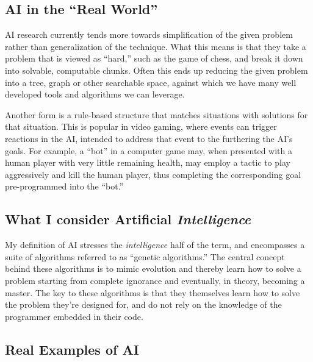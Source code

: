 \documentclass[12pt]{article} %
\begin{document}

\subsection{AI in the ``Real World''}

AI research currently tends more towards simplification of the given problem rather than generalization of the technique. What this means is that they take a problem that is viewed as ``hard,'' such as the game of chess, and break it down into solvable, computable chunks. Often this ends up reducing the given problem into a tree, graph or other searchable space, against which we have many well developed tools and algorithms we can leverage.

Another form is a rule-based structure that matches situations with solutions for that situation. This is popular in video gaming, where events can trigger reactions in the AI, intended to address that event to the furthering the AI's goals. For example, a ``bot'' in a computer game may, when presented with a human player with very little remaining health, may employ a tactic to play aggressively and kill the human player, thus completing the corresponding goal pre-programmed into the ``bot.''


\subsection{What I consider Artificial \textit{Intelligence}}

My definition of AI stresses the \textit{intelligence} half of the term, and encompasses a suite of algorithms referred to as ``genetic algorithms.'' The central concept behind these algorithms is to mimic evolution and thereby learn how to solve a problem starting from complete ignorance and eventually, in theory, becoming a master. The key to these algorithms is that they themselves learn how to solve the problem they're designed for, and do not rely on the knowledge of the programmer embedded in their code.


\subsection{Real Examples of AI}
\end{document}
